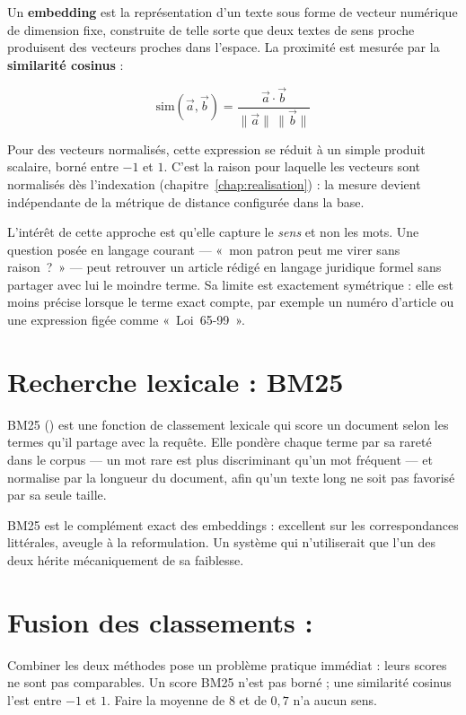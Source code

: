 Un \textbf{embedding} est la représentation d'un texte sous forme de vecteur numérique de
dimension fixe, construite de telle sorte que deux textes de sens proche produisent des vecteurs
proches dans l'espace. La proximité est mesurée par la \textbf{similarité cosinus} :

\begin{equation}
  \mathrm{sim}(\vec{a}, \vec{b}) = \frac{\vec{a} \cdot \vec{b}}{\|\vec{a}\|\,\|\vec{b}\|}
  \label{eq:cosinus}
\end{equation}

Pour des vecteurs normalisés, cette expression se réduit à un simple produit scalaire, borné
entre $-1$ et $1$. C'est la raison pour laquelle les vecteurs sont normalisés dès l'indexation
(chapitre~\ref{chap:realisation}) : la mesure devient indépendante de la métrique de distance
configurée dans la base.

L'intérêt de cette approche est qu'elle capture le \emph{sens} et non les mots. Une question posée
en langage courant --- «~mon patron peut me virer sans raison~?~» --- peut retrouver un article
rédigé en langage juridique formel sans partager avec lui le moindre terme. Sa limite est
exactement symétrique : elle est moins précise lorsque le terme exact compte, par exemple un
numéro d'article ou une expression figée comme «~Loi~65-99~».

\section{Recherche lexicale : BM25}

BM25 () est une fonction de classement lexicale qui score un document
selon les termes qu'il partage avec la requête. Elle pondère chaque terme par sa rareté dans le
corpus --- un mot rare est plus discriminant qu'un mot fréquent --- et normalise par la longueur
du document, afin qu'un texte long ne soit pas favorisé par sa seule taille.

BM25 est le complément exact des embeddings : excellent sur les correspondances littérales,
aveugle à la reformulation. Un système qui n'utiliserait que l'un des deux hérite mécaniquement de
sa faiblesse.

\section{Fusion des classements : }

Combiner les deux méthodes pose un problème pratique immédiat : leurs scores ne sont pas
comparables. Un score BM25 n'est pas borné ; une similarité cosinus l'est entre $-1$ et $1$. Faire
la moyenne de $8$ et de $0{,}7$ n'a aucun sens.

